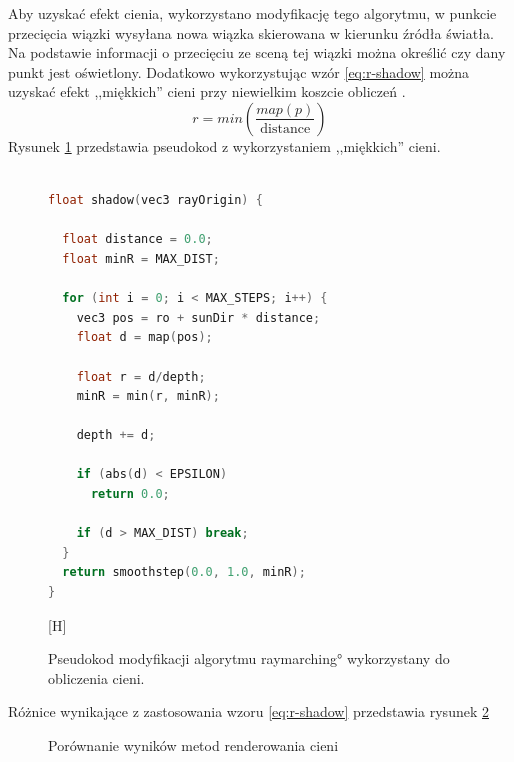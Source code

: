 Aby uzyskać efekt cienia, wykorzystano modyfikację tego algorytmu, w punkcie przecięcia wiązki wysyłana nowa wiązka skierowana w kierunku źródła światła. Na podstawie informacji o przecięciu ze sceną tej wiązki można określić czy dany punkt jest oświetlony. Dodatkowo wykorzystując wzór \ref{eq:r-shadow} można uzyskać efekt ,,miękkich'' cieni przy niewielkim koszcie obliczeń \cite{bib:iqsoftshadow}.
\begin{equation}
\label{eq:r-shadow}
r = min(\frac{map(p)}{\text{distance}})
\end{equation}
Rysunek \ref{fig:pseudokod:shadow} przedstawia pseudokod z wykorzystaniem ,,miękkich'' cieni.
\begin{figure}[H]
\centering
\begin{lstlisting}[language=C]

float shadow(vec3 rayOrigin) {

  float distance = 0.0;
  float minR = MAX_DIST;

  for (int i = 0; i < MAX_STEPS; i++) {
    vec3 pos = ro + sunDir * distance;
    float d = map(pos);

    float r = d/depth;
    minR = min(r, minR);

    depth += d;

    if (abs(d) < EPSILON)
      return 0.0;

    if (d > MAX_DIST) break;
  }
  return smoothstep(0.0, 1.0, minR);
}
\end{lstlisting}[H]
\caption{Pseudokod modyfikacji algorytmu \ang{raymarching} wykorzystany do obliczenia cieni.}
\label{fig:pseudokod:shadow}
\end{figure}

Różnice wynikające z zastosowania wzoru \ref{eq:r-shadow} przedstawia rysunek \ref{fig:shadow-comp}

\begin{figure}[H]
\centering
{}
\caption{Porównanie wyników metod renderowania cieni}
\label{fig:shadow-comp}
\end{figure}


